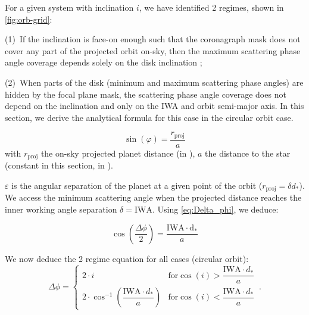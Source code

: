 \documentclass[
    usenatbib,
]{mnras}
\begin{document}
For a given system with inclination $i$, we have identified 2 regimes, shown in \cref{fig:orb-grid}:

(1)~If the inclination is face-on enough such that the coronagraph mask does not cover any part of the projected orbit on-sky, then the maximum scattering phase angle coverage depends solely on the disk inclination ;

(2)~When parts of the disk (minimum and maximum scattering phase angles) are hidden by the focal plane mask, the scattering phase angle coverage does not depend on the inclination and only on the IWA and orbit semi-major axis. In this section, we derive the analytical formula for this case in the circular orbit case. 

%    

\begin{equation}
    \sin(\varphi) = \frac{r_\mathrm{proj}}{a}
\end{equation}
with $r_\mathrm{proj}$ the on-sky projected planet distance (in \si{\au}), $a$ the distance to the star (constant in this section, in \si{\au}). 

$\varepsilon$ is the angular separation of the planet at a given point of the orbit ($r_\mathrm{proj} = \delta d_*$). 
We access the minimum scattering angle when the projected distance reaches the inner working angle separation $\delta = \mathrm{IWA}$. 
Using \cref{eq:Delta_phi}, we deduce:

\begin{equation}
    \cos\left(\dfrac{\Delta \phi}{2}\right) = \frac{\mathrm{IWA \cdot d_*}}{a}
\end{equation}

We now deduce the 2 regime equation for all cases (circular orbit): 
\begin{equation}
\label{eq:Delta_phi_max}
    \Delta \phi = 
    \begin{cases}
        2 \cdot i & \textrm{for} \cos(i) > \dfrac{\mathrm{IWA}\cdot d_* }{a}
  \\ 
        2 \cdot \cos^{-1}\left(\dfrac{\mathrm{IWA}\cdot d_* }{a}\right)  & \textrm{for} \cos(i) < \dfrac{\mathrm{IWA}\cdot d_* }{a}
    \end{cases}\,.
\end{equation}
\end{document}
